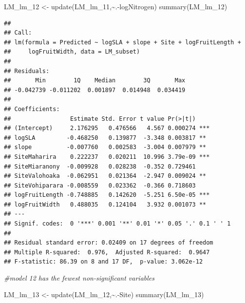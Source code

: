 \documentclass[
  12pt,
]{article}
\newenvironment{Shaded}{\begin{snugshade}}{\end{snugshade}}
\newcommand{\CommentTok}[1]{\textcolor[rgb]{0.56,0.35,0.01}{\textit{#1}}}
\newcommand{\FunctionTok}[1]{\textcolor[rgb]{0.00,0.00,0.00}{#1}}
\newcommand{\NormalTok}[1]{#1}
\newcommand{\OtherTok}[1]{\textcolor[rgb]{0.56,0.35,0.01}{#1}}
\newcommand{\SpecialCharTok}[1]{\textcolor[rgb]{0.00,0.00,0.00}{#1}}
\begin{document}
\begin{Shaded}
\begin{Highlighting}[]
\NormalTok{LM\_lm\_12 }\OtherTok{\textless{}{-}} \FunctionTok{update}\NormalTok{(LM\_lm\_11,}\SpecialCharTok{\textasciitilde{}}\NormalTok{.}\SpecialCharTok{{-}}\NormalTok{logNitrogen)}
\FunctionTok{summary}\NormalTok{(LM\_lm\_12)}
\end{Highlighting}
\end{Shaded}

\begin{verbatim}
## 
## Call:
## lm(formula = Predicted ~ logSLA + slope + Site + logFruitLength + 
##     logFruitWidth, data = LM_subset)
## 
## Residuals:
##       Min        1Q    Median        3Q       Max 
## -0.042739 -0.011202  0.001897  0.014948  0.034419 
## 
## Coefficients:
##                 Estimate Std. Error t value Pr(>|t|)    
## (Intercept)     2.176295   0.476566   4.567 0.000274 ***
## logSLA         -0.468250   0.139877  -3.348 0.003817 ** 
## slope          -0.007760   0.002583  -3.004 0.007979 ** 
## SiteMaharira    0.222237   0.020211  10.996 3.79e-09 ***
## SiteMiaranony  -0.009928   0.028238  -0.352 0.729461    
## SiteValohoaka  -0.062951   0.021364  -2.947 0.009024 ** 
## SiteVohiparara -0.008559   0.023362  -0.366 0.718603    
## logFruitLength -0.748885   0.142620  -5.251 6.50e-05 ***
## logFruitWidth   0.488035   0.124104   3.932 0.001073 ** 
## ---
## Signif. codes:  0 '***' 0.001 '**' 0.01 '*' 0.05 '.' 0.1 ' ' 1
## 
## Residual standard error: 0.02409 on 17 degrees of freedom
## Multiple R-squared:  0.976,  Adjusted R-squared:  0.9647 
## F-statistic: 86.39 on 8 and 17 DF,  p-value: 3.062e-12
\end{verbatim}

\begin{Shaded}
\begin{Highlighting}[]
\CommentTok{\#model 12 has the fewest non{-}significant variables}

\NormalTok{LM\_lm\_13 }\OtherTok{\textless{}{-}} \FunctionTok{update}\NormalTok{(LM\_lm\_12,}\SpecialCharTok{\textasciitilde{}}\NormalTok{.}\SpecialCharTok{{-}}\NormalTok{Site)}
\FunctionTok{summary}\NormalTok{(LM\_lm\_13)}
\end{Highlighting}
\end{Shaded}
\end{document}
